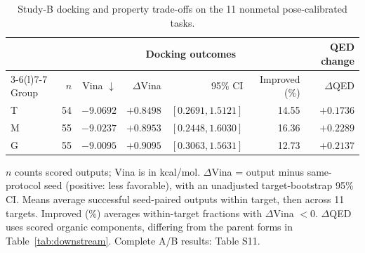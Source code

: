 \begin{table}[H]
\centering\small
\caption{Study-B docking and property trade-offs on the 11 nonmetal pose-calibrated tasks.}
\label{tab:calibrated_docking}
\setlength{\tabcolsep}{3pt}
\renewcommand{\arraystretch}{1.12}
\begin{tabular*}{\linewidth}{@{\extracolsep{\fill}}lrrrrrr@{}}
\toprule
 & & \multicolumn{4}{c}{Docking outcomes} & QED change \\
\cmidrule(lr){3-6}\cmidrule(l){7-7}
Group & $n$ & Vina $\downarrow$ & $\Delta$Vina & 95\% CI & Improved (\%) & $\Delta$QED \\
\midrule
T & 54 & $-9.0692$ & $+0.8498$ & $[0.2691, 1.5121]$ & 14.55 & $+0.1736$ \\
M & 55 & $-9.0237$ & $+0.8953$ & $[0.2448, 1.6030]$ & 16.36 & $+0.2289$ \\
G & 55 & $-9.0095$ & $+0.9095$ & $[0.3063, 1.5631]$ & 12.73 & $+0.2137$ \\
\bottomrule
\end{tabular*}
\par\smallskip
\begin{minipage}{\linewidth}\footnotesize
$n$ counts scored outputs; Vina is in kcal/mol. $\Delta$Vina = output minus same-protocol seed (positive: less favorable), with an unadjusted target-bootstrap 95\% CI. Means average successful seed-paired outputs within target, then across 11 targets. Improved (\%) averages within-target fractions with $\Delta$Vina $<0$. $\Delta$QED uses scored organic components, differing from the parent forms in Table~\ref{tab:downstream}. Complete A/B results: Table S11.
\end{minipage}
\end{table}
